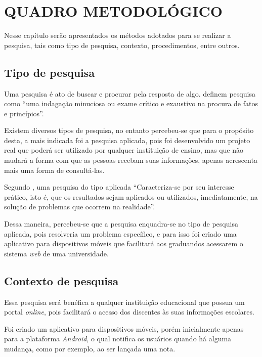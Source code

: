 \chapter{QUADRO METODOLÓGICO}

	\par Nesse capítulo serão apresentados os métodos adotados para se realizar a
pesquisa, tais como tipo de pesquisa, contexto, procedimentos, entre outros.

\section{Tipo de pesquisa}
	
	\par Uma pesquisa é ato de buscar e procurar pela resposta de algo.
 definem pesquisa como “uma indagação minuciosa
ou exame crítico e exaustivo na procura de fatos e princípios”.

	\par Existem diversos tipos de pesquisa, no entanto percebeu-se que para o
propósito desta, a mais indicada foi a pesquisa aplicada, pois foi desenvolvido
um projeto real que poderá ser utilizado por qualquer instituição de ensino,
mas que não mudará a forma com que as pessoas recebam suas informações, apenas
acrescenta mais uma forma de consultá-las.

	\par Segundo , uma pesquisa do tipo aplicada
“Caracteriza-se por seu interesse prático, isto é, que os resultados sejam
aplicados ou utilizados, imediatamente, na solução de problemas que ocorrem na
realidade”.

	\par Dessa maneira, percebeu-se que a pesquisa enquadra-se no tipo de pesquisa
aplicada, pois resolveria um problema específico, e para isso foi criado uma
aplicativo para dispositivos móveis que facilitará aos graduandos acessarem o
sistema \textit{web} de uma universidade.

\section{Contexto de pesquisa}

	\par Essa pesquisa será benéfica a qualquer instituição educacional que possua
um portal \textit{online}, pois facilitará o acesso dos discentes às suas
informações escolares.

	\par Foi criado um aplicativo para dispositivos móveis, porém inicialmente
apenas para a plataforma \textit{Android}, o qual notifica os usuários quando
há alguma mudança, como por exemplo, ao ser lançada uma nota.
	
